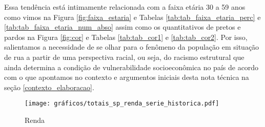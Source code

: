 \documentclass[14pt]{extarticle}
\begin{document}
Essa tendência está intimamente relacionada com a faixa etária 30 a 59 anos como vimos na Figura \ref{fig:faixa_estaria} e Tabelas \ref{tab:tab_faixa_etaria_perc} e \ref{tab:tab_faixa_etaria_num_abso} assim como os quantitativos de pretos e pardos na Figura \ref{fig:cor} e Tabelas \ref{tab:tab_cor1} e \ref{tab:tab_cor2}. Por isso, salientamos a necessidade de se olhar para o fenômeno da população em situação de rua a partir de uma perspectiva racial, ou seja, do racismo estrutural que ainda determina a condição de vulnerabilidade socioeconômica no país de acordo com o que apontamos no contexto e argumentos iniciais desta nota técnica na seção \ref{contexto_elaboracao}.  

\begin{figure}[H]
\centering
	\caption{Renda}
	\texttt{[image: gráficos/totais\_sp\_renda\_serie\_historica.pdf]}
	\label{fig:renda2}
\end{figure}
%
\end{document}
